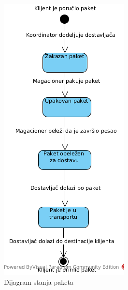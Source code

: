 \begin{figure}[H]
\begin{center}
\includegraphics[scale=0.75]{Pictures/state_package.png}
\end{center}
    \caption{Dijagram stanja paketa}
\label{fig:StatePackage}
\end{figure}

